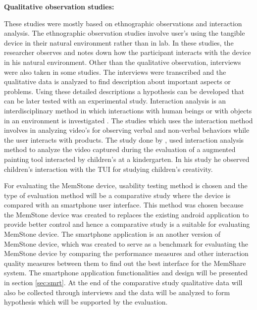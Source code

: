 \documentclass[mscthesis]{usiinfthesis}
\begin{document}
\textbf{Qualitative observation studies:}

These studies were mostly based on ethnographic observations and interaction analysis. The ethnographic observation studies involve user's using the tangible device in their natural environment rather than in lab. In these studies, the researcher observes and notes down how the participant interacts with the device in his natural environment. Other than the qualitative observation, interviews were also taken in some studies. The interviews were transcribed and the qualitative data is analyzed to find description about important aspects or problems. Using these detailed descriptions a hypothesis can be developed that can be later tested with an experimental study. Interaction analysis is an interdisciplinary method in which interactions with human beings or with objects in an environment is investigated \citep{jordan_interaction_1995}. The studies which uses the interaction method involves in analyzing video's for observing verbal and non-verbal behaviors while the user interacts with products. The study done by \citeauthor{ryokai_i/o_2004}, used interaction analysis method to analyze the video captured during the evaluation of a augmented painting tool interacted by children's at a kindergarten. In his study he observed children's interaction with the TUI for studying children's creativity. 
\newline

For evaluating the MemStone device, usability testing method is chosen and the type of evaluation method will be a comparative study where the device is compared with an smartphone user interface. This method was chosen because the MemStone device was created to replaces the existing android application to provide better control and hence a comparative study is a suitable for evaluating MemStone device. The smartphone application is an another version of MemStone device, which was created to serve as a benchmark for evaluating the MemStone device by comparing the performance measures and other interaction quality measures between them to find out the best interface for the MemShare system. The smartphone application functionalities and design will be presented in section \ref{sec:smrt}. At the end of the comparative study qualitative data will also be collected through interviews and the data will be analyzed to form hypothesis which will be supported by the evaluation.  
\end{document}
